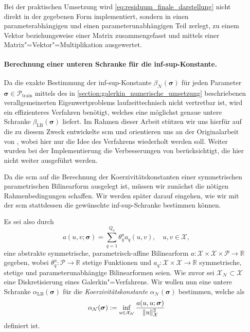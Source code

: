\documentclass[../main.tex]{subfiles}
\begin{document}
Bei der praktischen Umsetzung wird \cref{eq:residuum_finale_darstellung} nicht direkt in der gegebenen Form implementiert, sondern in einen parameterabhängigen und einen parameterunabhängigen Teil zerlegt, zu einem Vektor beziehungsweise einer Matrix zusammengefasst und mittels einer Matrix"=Vektor"=Multiplikation ausgewertet.


\paragraph{Berechnung einer unteren Schranke für die inf-sup-Konstante.} %
\label{par:berechnung_der_unteren_schranke_f_r_die_inf_sup_konstante_}

Da die exakte Bestimmung der inf-sup-Konstante $\beta_{\mathcal N}(\bm \sigma)$ für jeden Parameter $\bm \sigma \in \mathcal P_{\mathrm{train}}$ mittels des in \cref{section:galerkin_numerische_umsetzung} beschriebenen verallgemeinerten Eigenwertproblems laufzeittechnisch nicht vertretbar ist, wird ein effizienteres Verfahren benötigt, welches eine möglichst genaue untere Schranke $\beta_{\mathrm{LB}}(\bm \sigma)$ liefert.
Im Rahmen dieser Arbeit stützen wir uns hierfür auf die zu diesem Zweck entwickelte \ac{scm} und orientieren uns an der Originalarbeit von \textcite{Huynh2007}, wobei hier nur die Idee des Verfahrens wiederholt werden soll.
Weiter wurden bei der Implementierung die Verbesserungen von \textcite{Chen2009} berücksichtigt, die hier nicht weiter ausgeführt werden.

Da die \ac{scm} auf die Berechnung der Koerzivitätskonstanten einer symmetrischen parametrischen Bilinearform ausgelegt ist, müssen wir zunächst die nötigen Rahmenbedingungen schaffen.
Wir werden später darauf eingehen, wie wir mit der \ac{scm} stattdessen die gewünschte inf-sup-Schranke bestimmen können.

Es sei also durch
\begin{equation}
    a(u, v; \bm \sigma) = \sum_{q = 1}^{Q_a} \theta_{q}^{a} a_{q}(u, v), \quad u,v \in \mathcal X,
\end{equation}
eine abstrakte symmetrische, parametrisch-affine Bilinearform $a \colon \mathcal X \times \mathcal X \times \mathcal P \to \mathbb{R}$ gegeben, wobei $\theta_{q}^{a} \colon \mathcal P \to \mathbb{R}$ stetige Funktionen und $a_{q} \colon \mathcal X \times \mathcal X \to \mathbb{R}$ symmetrische, stetige und parameterunabhängige Bilinearformen seien.
Wie zuvor sei $\mathcal X_{\mathcal N} \subset \mathcal X$ eine Diskretisierung eines Galerkin"=Verfahrens.
Wir wollen nun eine untere Schranke $\alpha_{\mathrm{LB}}(\bm \sigma)$ für die \emph{Koerzivitätskonstante} $\alpha_{\mathcal N}(\bm \sigma)$ bestimmen, welche als
\begin{equation}
    \alpha_{\mathcal N}(\bm \sigma) := \inf_{u \in \mathcal X_{\mathcal N}} \frac{a(u, u; \bm \sigma)}{\lVert u\rVert_{\mathcal X}^{2}}
\end{equation}
definiert ist.
\end{document}
